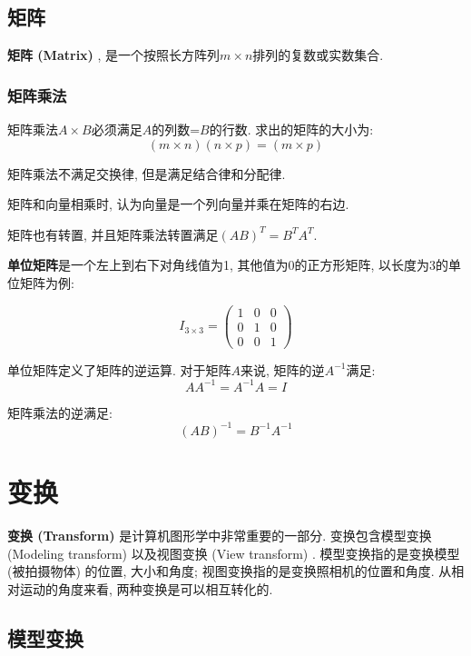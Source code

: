 \documentclass[openany]{progbookcn}
\begin{document}
\section{矩阵}

\textbf{矩阵 (Matrix) }, 是一个按照长方阵列$m\times n$排列的复数或实数集合. 

\subsection{矩阵乘法}

矩阵乘法$A\times B$必须满足$A$的列数=$B$的行数. 求出的矩阵的大小为: 
\begin{equation}
	(m\times n)(n\times p) = (m\times p)
\end{equation}

矩阵乘法不满足交换律, 但是满足结合律和分配律. 

矩阵和向量相乘时, 认为向量是一个列向量并乘在矩阵的右边. 

矩阵也有转置, 并且矩阵乘法转置满足$(AB)^T=B^TA^T$.

\textbf{单位矩阵}是一个左上到右下对角线值为1, 其他值为0的正方形矩阵, 以长度为3的单位矩阵为例: 

\begin{equation}
	I_{3\times 3}=\begin{pmatrix}
		1&0&0\\
		0&1&0\\
		0&0&1
	\end{pmatrix}
\end{equation}

单位矩阵定义了矩阵的逆运算. 对于矩阵$A$来说, 矩阵的逆$A^{-1}$满足: 
\begin{equation}
	AA^{-1}=A^{-1}A=I
\end{equation}

矩阵乘法的逆满足: 
\begin{equation}
	(AB)^{-1}=B^{-1}A^{-1}
\end{equation}

\chapter{变换}

\textbf{变换 (Transform) }是计算机图形学中非常重要的一部分. 变换包含模型变换 (Modeling transform) 以及视图变换 (View transform) . 模型变换指的是变换模型 (被拍摄物体) 的位置, 大小和角度; 视图变换指的是变换照相机的位置和角度. 从相对运动的角度来看, 两种变换是可以相互转化的. 

\section{模型变换}
\end{document}
